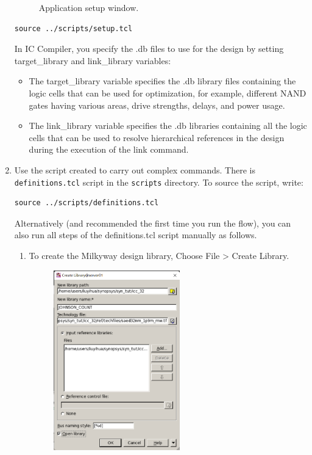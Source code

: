 \documentclass[a4paper,12pt,twoside]{article}
\begin{document}
\begin{enumerate}
\begin{figure}[H]
        \caption{Application setup window.}
    \end{figure}
    \begin{verbatim}
source ../scripts/setup.tcl
    \end{verbatim}
    In IC Compiler, you specify the .db files to use for the design by setting target\_library and link\_library variables:
    \begin{itemize}
        \item The target\_library variable specifies the .db library files containing the logic cells that can be used for optimization, for example, different NAND gates having various areas, drive strengths, delays, and power usage.
        \item The link\_library variable specifies the .db libraries containing all the logic cells that can be used to resolve hierarchical references in the design during the execution of the link command.
    \end{itemize}
    \item Use the script created to carry out complex commands. There is \texttt{definitions.tcl} script in the \texttt{scripts} directory. To source the script, write:
    \begin{verbatim}
source ../scripts/definitions.tcl
    \end{verbatim}
    Alternatively (and recommended the first time you run the flow), you can also run all steps of the definitions.tcl script manually as follows.
    \begin{enumerate}
        \item To create the Milkyway design library, Choose File > Create Library.
        \begin{figure}[H]
            \centering
            \includegraphics[width=0.55\textwidth]{images/5.png}

\end{figure}
\end{enumerate}
\end{enumerate}
\end{document}

